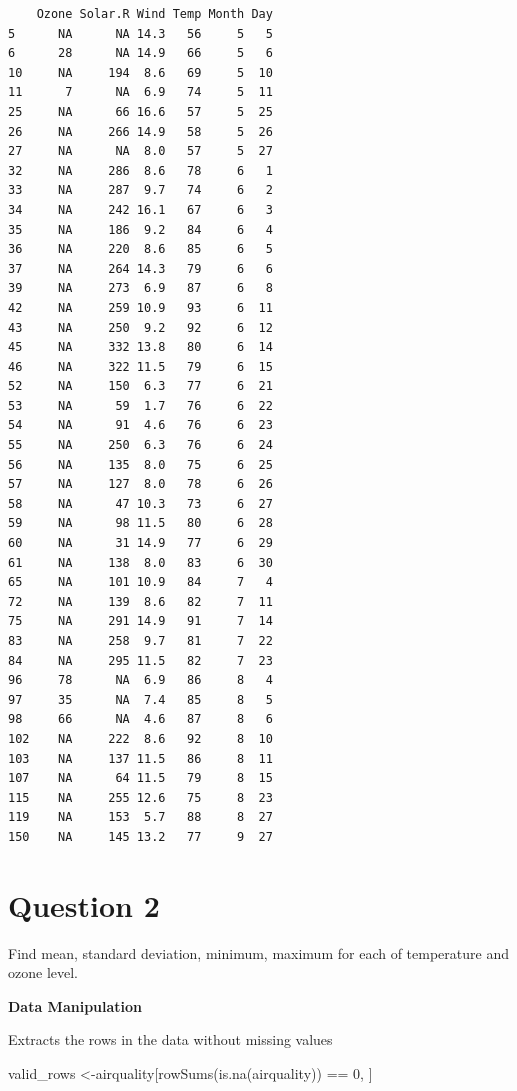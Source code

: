 \documentclass[
  letterpaper,
]{book}
\newenvironment{Shaded}{\begin{snugshade}}{\end{snugshade}}
\newcommand{\DecValTok}[1]{\textcolor[rgb]{0.68,0.00,0.00}{#1}}
\newcommand{\FunctionTok}[1]{\textcolor[rgb]{0.28,0.35,0.67}{#1}}
\newcommand{\NormalTok}[1]{\textcolor[rgb]{0.00,0.23,0.31}{#1}}
\newcommand{\OtherTok}[1]{\textcolor[rgb]{0.00,0.23,0.31}{#1}}
\newcommand{\SpecialCharTok}[1]{\textcolor[rgb]{0.37,0.37,0.37}{#1}}
\begin{document}
\begin{verbatim}
    Ozone Solar.R Wind Temp Month Day
5      NA      NA 14.3   56     5   5
6      28      NA 14.9   66     5   6
10     NA     194  8.6   69     5  10
11      7      NA  6.9   74     5  11
25     NA      66 16.6   57     5  25
26     NA     266 14.9   58     5  26
27     NA      NA  8.0   57     5  27
32     NA     286  8.6   78     6   1
33     NA     287  9.7   74     6   2
34     NA     242 16.1   67     6   3
35     NA     186  9.2   84     6   4
36     NA     220  8.6   85     6   5
37     NA     264 14.3   79     6   6
39     NA     273  6.9   87     6   8
42     NA     259 10.9   93     6  11
43     NA     250  9.2   92     6  12
45     NA     332 13.8   80     6  14
46     NA     322 11.5   79     6  15
52     NA     150  6.3   77     6  21
53     NA      59  1.7   76     6  22
54     NA      91  4.6   76     6  23
55     NA     250  6.3   76     6  24
56     NA     135  8.0   75     6  25
57     NA     127  8.0   78     6  26
58     NA      47 10.3   73     6  27
59     NA      98 11.5   80     6  28
60     NA      31 14.9   77     6  29
61     NA     138  8.0   83     6  30
65     NA     101 10.9   84     7   4
72     NA     139  8.6   82     7  11
75     NA     291 14.9   91     7  14
83     NA     258  9.7   81     7  22
84     NA     295 11.5   82     7  23
96     78      NA  6.9   86     8   4
97     35      NA  7.4   85     8   5
98     66      NA  4.6   87     8   6
102    NA     222  8.6   92     8  10
103    NA     137 11.5   86     8  11
107    NA      64 11.5   79     8  15
115    NA     255 12.6   75     8  23
119    NA     153  5.7   88     8  27
150    NA     145 13.2   77     9  27
\end{verbatim}


\chapter{Question 2}\label{question-2}

Find mean, standard deviation, minimum, maximum for each of temperature
and ozone level.

\textbf{Data Manipulation}

Extracts the rows in the data without missing values

\begin{Shaded}
\begin{Highlighting}[]
\NormalTok{valid\_rows }\OtherTok{\textless{}{-}}\NormalTok{airquality[}\FunctionTok{rowSums}\NormalTok{(}\FunctionTok{is.na}\NormalTok{(airquality)) }\SpecialCharTok{==} \DecValTok{0}\NormalTok{, ]}
\end{Highlighting}
\end{Shaded}
\end{document}
